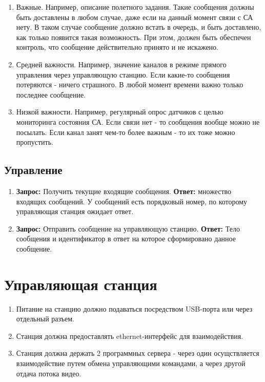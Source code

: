 \documentclass[utf8]{report}
\begin{document}
\begin{enumerate}
  \item Важные. Например, описание полетного задания. Такие сообщения должны быть доставлены в любом случае, даже если на данный момент связи с СА нету. В таком случае сообщение должно встать в очередь, и быть доставлено, как только появится такая возможность. При этом, должен быть обеспечен контроль, что сообщение действительно принято и не искажено.
  \item Средней важности. Например, значение каналов в режиме прямого управления через управляющую станцию. Если какие-то сообщения потеряются - ничего страшного. В любой момент времени важно только последнее сообщение.
  \item Низкой важности. Например, регулярный опрос датчиков с целью мониторинга состояния СА. Если связи нет - то сообщения вообще можно не посылать. Если канал занят чем-то более важным - то их тоже можно пропустить.
\end{enumerate}

\subsection{Управление}
\begin{enumerate}
  \item \textbf{Запрос:} Получить текущие входящие сообщения. \textbf{Ответ:} множество входящих сообщений. У сообщений есть порядковый номер, по которому управляющая станция ожидает ответ.
  \item \textbf{Запрос:} Отправить сообщение на управляющую станцию. \textbf{Ответ:} Тело сообщения и идентификатор в ответ на которое сформировано данное сообщение.
\end{enumerate}

\section{Управляющая станция}

\begin{enumerate}
  \item Питание на станцию должно подаваться посредством USB-порта или через отдельный разъем.
  \item Станция должна предоставлять ethernet-интерфейс для взаимодействия.
  \item Станция должна держать 2 программных сервера - через один осущствляется взаимодействие путем обмена управляющими командами, а через другой отдача потока видео.
\end{enumerate}
\end{document}
